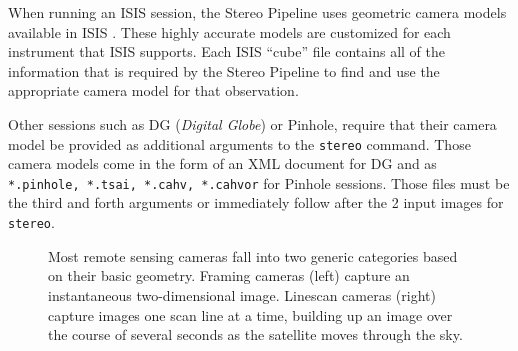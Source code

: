 When running an ISIS session, the Stereo Pipeline uses geometric
camera models available in \ac{ISIS} \citep{anderson08:isis}.  These
highly accurate models are customized for each instrument that
\ac{ISIS} supports.  Each \ac{ISIS} ``cube'' file contains all of the
information that is required by the Stereo Pipeline to find and use
the appropriate camera model for that observation.

Other sessions such as DG (\textit{Digital Globe}) or Pinhole, require that
their camera model be provided as additional arguments to the
\texttt{stereo} command. Those camera models come in the form of an
XML document for DG and as \texttt{*.pinhole, *.tsai, *.cahv,
  *.cahvor} for Pinhole sessions. Those files must be the third and
forth arguments or immediately follow after the 2 input images for
\texttt{stereo}.

\begin{figure}[h]
\centering
\caption{Most remote sensing cameras fall into two generic categories
  based on their basic geometry.  Framing cameras (left) capture an
  instantaneous two-dimensional image.  Linescan cameras (right)
  capture images one scan line at a time, building up an image over
  the course of several seconds as the satellite moves through the
  sky.}
\label{fig:camera_models}
\end{figure}

